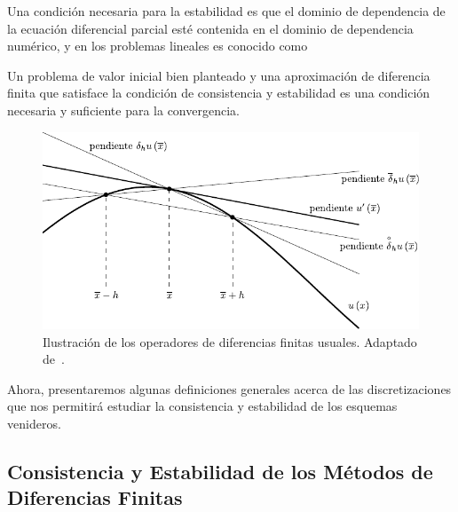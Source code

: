Una condición necesaria para la estabilidad es que el dominio de
dependencia de la ecuación diferencial parcial esté contenida en el
dominio de dependencia numérico, y en los problemas lineales es
conocido como

\begin{theorem}
    Un problema de valor inicial bien planteado y una aproximación de
    diferencia finita que satisface la condición de consistencia y
    estabilidad es una condición necesaria y suficiente para la
    convergencia.
\end{theorem}

\begin{figure}[ht!]
    \centering
    \includegraphics[width=.5\paperwidth]{E_IMAGENES/1_Capitulo2/finite_difference.pdf}
    \caption{
        Ilustración de los operadores de diferencias finitas usuales.
        Adaptado de~\citep{leveque_numerical_1992}.
    }
\end{figure}

Ahora, presentaremos algunas definiciones generales acerca de las
discretizaciones que nos permitirá estudiar la consistencia y
estabilidad de los esquemas venideros.

\subsection{Consistencia y Estabilidad de los Métodos de Diferencias Finitas}

